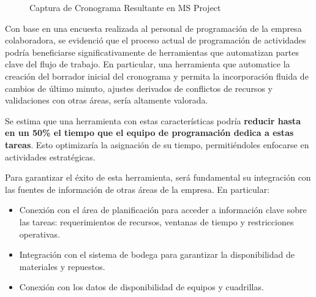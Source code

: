 \documentclass{article}
\begin{document}
\begin{figure}[htbp]
    \centering
    \caption{Captura de Cronograma Resultante en MS Project}
    \label{fig:gantt-project}
  \end{figure}
  
  

Con base en una encuesta realizada al personal de programación de la empresa colaboradora, se evidenció que el proceso actual de programación de actividades podría beneficiarse significativamente de herramientas que automatizan partes clave del flujo de trabajo. En particular, una herramienta que automatice la creación del borrador inicial del cronograma y permita la incorporación fluida de cambios de último minuto, ajustes derivados de conflictos de recursos y validaciones con otras áreas, sería altamente valorada.

Se estima que una herramienta con estas características podría \textbf{reducir hasta en un 50\% el tiempo que el equipo de programación dedica a estas tareas}. Esto optimizaría la asignación de su tiempo, permitiéndoles enfocarse en actividades estratégicas.

Para garantizar el éxito de esta herramienta, será fundamental su integración con las fuentes de información de otras áreas de la empresa. En particular:
\begin{itemize}
    \item Conexión con el área de planificación para acceder a información clave sobre las tareas: requerimientos de recursos, ventanas de tiempo y restricciones operativas.
    \item Integración con el sistema de bodega para garantizar la disponibilidad de materiales y repuestos.
    \item Conexión con los datos de disponibilidad de equipos y cuadrillas.
\end{itemize}
\end{document}
